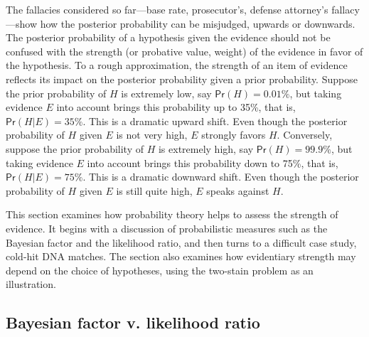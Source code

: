 \documentclass{article}
\newcommand{\pr}{\mathsf{Pr}}
\begin{document}
The fallacies considered so far---base rate, prosecutor's, defense attorney's fallacy---show how the posterior probability can be misjudged, upwards or downwards.  
The posterior probability of a hypothesis given the  evidence %
should not be confused with the strength  (or probative value, weight) of the evidence in favor of the hypothesis. 
To a rough approximation, the strength of an item of evidence reflects its impact on the posterior probability given a prior probability.
Suppose the prior probability of $H$ is extremely low, say $\pr(H)=0.01\%$, but taking evidence $E$ into account brings this probability up to 35\%, that is, $\pr(H \vert E)=35\%$. This is a dramatic upward shift. Even though the posterior probability of $H$ given $E$ is not very high, $E$ strongly favors $H$.  Conversely, suppose the prior probability of $H$ is extremely high, say $\pr(H)=99.9\%$, but taking evidence $E$ into account brings this probability down to 75\%, that is, $\pr(H \vert E)=75\%$. This is a dramatic downward shift. Even though the posterior probability of $H$ given $E$ is still quite high, $E$
speaks  against $H$. 


This section examines how 
probability theory helps to assess the strength of evidence. It begins with a discussion of probabilistic measures such as the Bayesian factor and the likelihood ratio, %
and then turns to a difficult case study, cold-hit DNA matches. %
The section also examines  
how evidentiary strength may depend on the choice of hypotheses, using  %
 the two-stain problem as an illustration. %


\subsection{Bayesian factor v. likelihood ratio}
\label{subse:LRlogical}
\end{document}
